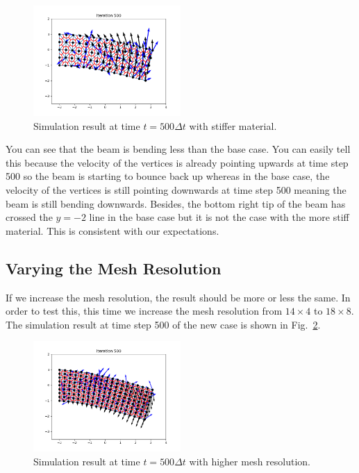 \documentclass[acmtog]{acmart}
\begin{document}
\begin{figure}[H]
  \centering
  \includegraphics[width=0.5\textwidth]{images/material.png}
  \caption{Simulation result at time $t=500\Delta t$ with stiffer material.}
  \label{fig:material}
\end{figure}

You can see that the beam is bending less than the base case. You can easily tell this because the velocity of the vertices is already pointing upwards at time step 500 so the beam is starting to bounce back up whereas in the base case, the velocity of the vertices is still pointing downwards at time step 500 meaning the beam is still bending downwards. Besides, the bottom right tip of the beam has crossed the $y=-2$ line in the base case but it is not the case with the more stiff material. This is consistent with our expectations.

\subsection{Varying the Mesh Resolution}
If we increase the mesh resolution, the result should be more or less the same. In order to test this, this time we increase the mesh resolution from $14 \times 4$ to $18 \times 8$. The simulation result at time step 500 of the new case is shown in Fig.~\ref{fig:resolution}.

\begin{figure}[H]
  \centering
  \includegraphics[width=0.5\textwidth]{images/resolution.png}
  \caption{Simulation result at time $t=500\Delta t$ with higher mesh resolution.}
  \label{fig:resolution}
\end{figure}
\end{document}
